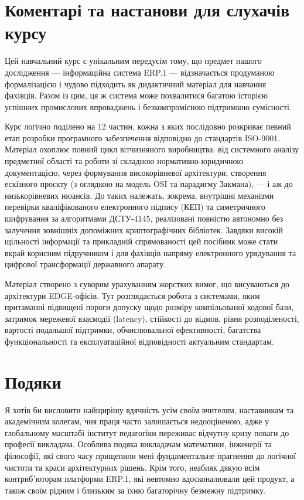 \section*{Коментарі та настанови для слухачів курсу}

Цей навчальний курс є унікальним передусім тому, що предмет нашого дослідження — інформаційна система ERP.1 — відзначається продуманою формалізацією і чудово підходить як дидактичний матеріал для навчання фахівців. Разом із цим, ця ж система може похвалитися багатою історією успішних промислових впроваджень і безкомпромісною підтримкою сумісності.

Курс логічно поділено на 12 частин, кожна з яких послідовно розкриває певний етап розробки програмного забезпечення відповідно до стандартів ISO-9001. Матеріал охоплює повний цикл вітчизняного виробництва: від системного аналізу предметної області та роботи зі складною нормативно-юридичною документацією, через формування високорівневої архітектури, створення ескізного проєкту (з оглядкою на модель OSI та парадигму Закмана), — і аж до низькорівневих нюансів. До таких належать, зокрема, внутрішні механізми перевірки кваліфікованого електронного підпису (КЕП) та симетричного шифрування за алгоритмами ДСТУ-4145, реалізовані повністю автономно без залучення зовнішніх допоміжних криптографічних бібліотек. Завдяки високій щільності інформації та прикладній спрямованості цей посібник може стати вкрай корисним підручником і для фахівців напряму електронного урядування та цифрової трансформації державного апарату.

Матеріал створено з суворим урахуванням жорстких вимог, що висуваються до архітектури EDGE-офісів. Тут розглядається робота з системами, яким притаманні підвищені пороги допуску щодо розміру компільованої кодової бази, затримок мережевої взаємодії (latency), стійкості до відмов, рівня розподіленості, вартості подальшої підтримки, обчислювальної ефективності, багатства функціональності та експлуатаційної відповідності актуальним стандартам.

\section*{Подяки}

Я хотів би висловити найщирішу вдячність усім своїм вчителям, наставникам та академічним колегам, чия праця часто залишається недооціненою,
адже у глобальному масштабі інститут педагогіки переживає відчутну кризу поваги до професії викладача.
Особлива подяка викладачам математики, інженерії та філософії, які свого часу прищепили мені фундаментальне прагнення до логічної
чистоти та краси архітектурних рішень. Крім того, неабияк дякую всім контриб'юторам платформи ERP.1,
які невтомно вдосконалювали цей продукт, а також своїм рідним і близьким за їхню багаторічну безмежну підтримку.

